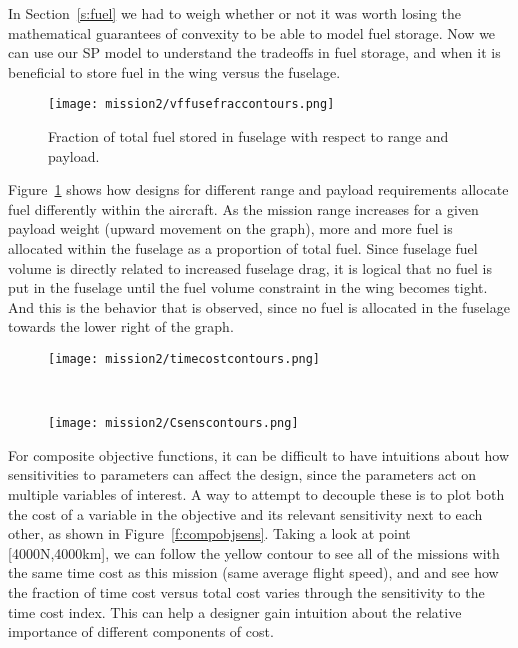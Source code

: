 In Section~\ref{s:fuel} we had to weigh whether or not it was worth losing the mathematical
guarantees of convexity to be able to model fuel storage. Now we can use our \gls{SP} model to understand
the tradeoffs in fuel storage, and when it is beneficial to store fuel in the wing versus the fuselage.

\begin{center}
\begin{figure}
    \texttt{[image: mission2/vffusefraccontours.png]}
    \caption{Fraction of total fuel stored in fuselage with respect to range and payload.}
    \label{f:fusefuelfrac}
\end{figure}
\end{center}

Figure~\ref{f:fusefuelfrac} shows how designs for different range and payload requirements
allocate fuel differently within the aircraft. As the mission range increases for a given payload weight
(upward movement on the graph),
more and more fuel is allocated within the fuselage as a proportion of total fuel. Since fuselage fuel
volume is directly related to increased fuselage drag, it is logical that no fuel is put in the fuselage
until the fuel volume constraint in the wing becomes tight. And this is the behavior that is observed,
since no fuel is allocated in the fuselage towards the lower right of the graph.

\begin{figure*}[t!]
    \centering
    \begin{subfigure}[t]{0.5\linewidth}
        \centering
        \texttt{[image: mission2/timecostcontours.png]}
    \end{subfigure}%
    ~
    \begin{subfigure}[t]{0.5\linewidth}
        \centering
        \texttt{[image: mission2/Csenscontours.png]}
    \end{subfigure}
    \caption[Time cost and time cost index sensitivity contours.]{Time cost and time cost index sensitivity contours.
    We can gain intuition about the relative importance of different components
    of composite objective functions by showing both the costs and their sensitivities together.}
    \label{f:compobjsens}
\end{figure*}

For composite objective functions, it can be difficult to have intuitions about how sensitivities
to parameters can affect the design, since the parameters act on multiple variables of interest. A way
to attempt to decouple these is to plot both the cost of a variable in the objective and its relevant
sensitivity next to each other, as shown in Figure~\ref{f:compobjsens}. Taking a look at point [4000N,4000km],
we can follow the yellow contour to see all of the missions with the same time cost as this mission
(same average flight speed), and
and see how the fraction of time cost versus total cost varies through the sensitivity to the time cost index.
This can help a designer gain intuition about the relative importance of different components of cost.

